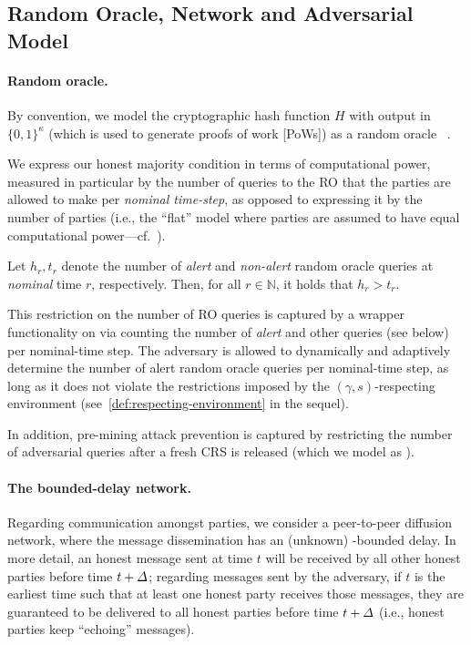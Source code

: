 \subsection{Random Oracle, Network and Adversarial Model}
\label{subsec:ro-network-corruption}

\paragraph{Random oracle.}
%
By convention, we model the cryptographic hash function $H$ with output in $\{0, 1\}^\kappa$ (which is used to generate proofs of work [PoWs]) as a random oracle \funcRO~\cite{CCS:BelRog93}.



We express our honest majority condition in terms of computational power, measured in particular by the number of queries to the RO that the parties are allowed to make per \emph{nominal time-step}, as opposed to expressing it by the number of parties (i.e., the ``flat'' model where parties are assumed to have equal computational power---cf.~\cite{EC:GarKiaLeo15}).

\begin{definition}
    Let $h_r, t_r$ denote the number of \emph{alert} and \emph{non-alert} random oracle queries at \emph{nominal} time $r$, respectively.
    Then, for all $r \in \mathbb{N}$, it holds that $h_r > t_r$.
\end{definition}

This restriction on the number of RO queries is captured by a wrapper functionality on \funcRO via counting the number of \emph{alert} and other queries (see below) per nominal-time step.
%
The adversary is allowed to dynamically and adaptively determine the number of alert random oracle queries per nominal-time step, as long as it does not violate the restrictions imposed by the $(\gamma, s)$-respecting environment (see~\cref{def:respecting-environment} in the sequel).



In addition, pre-mining attack prevention is captured by restricting the number of adversarial queries after a fresh CRS is released (which we model as \funcCRS).



\paragraph{The bounded-delay network.}
%
Regarding communication amongst parties, we consider a peer-to-peer diffusion network, where the message dissemination has an (unknown) \delay-bounded delay.
%
In more detail, an honest message sent at time $t$ will be received by all other honest parties before time $t + \varDelta$; regarding messages sent by the adversary, if $t$ is the earliest time such that at least one honest party receives those messages, they are guaranteed to be delivered to all honest parties before time $t + \varDelta$ (i.e., honest parties keep ``echoing'' messages).

